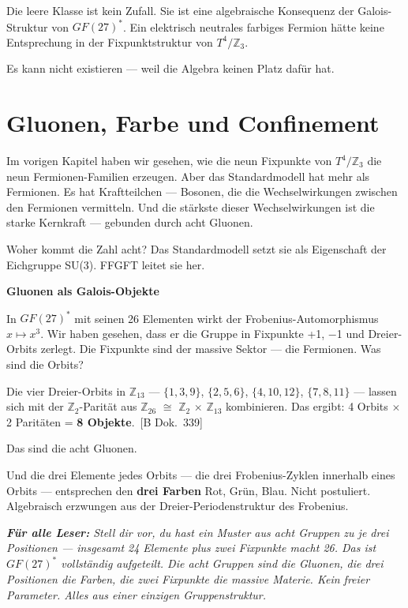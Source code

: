 \documentclass[11pt,oneside]{book}
\newcommand{\status}[1]{\penalty10000\,{\scriptsize\textcolor{gray!60}{[#1]}}}
\newenvironment{laierspur}{%
  \par\vspace{4pt}%
  \noindent\small\itshape\color{blue!60!black}%
  \textbf{Für alle Leser:}\enspace\ignorespaces}{%
  \par\vspace{4pt}\normalsize\normalfont\normalcolor}
\begin{document}
Die leere Klasse ist kein Zufall. Sie ist eine algebraische Konsequenz der
Galois-Struktur von $GF(27)^*$. Ein elektrisch neutrales farbiges Fermion
hätte keine Entsprechung in der Fixpunktstruktur von $T^4/\mathbb{Z}_3$.


Es kann nicht existieren — weil die Algebra keinen Platz dafür hat.








\chapter{Gluonen, Farbe und Confinement}

Im vorigen Kapitel haben wir gesehen, wie die neun Fixpunkte von $T^4/\mathbb{Z}_3$
die neun Fermionen-Familien erzeugen. Aber das Standardmodell hat mehr
als Fermionen. Es hat Kraftteilchen — Bosonen, die die Wechselwirkungen
zwischen den Fermionen vermitteln. Und die stärkste dieser Wechselwirkungen
ist die starke Kernkraft — gebunden durch acht Gluonen.


Woher kommt die Zahl acht? Das Standardmodell setzt sie als Eigenschaft
der Eichgruppe SU(3). FFGFT leitet sie her.


\textbf{Gluonen als Galois-Objekte}


In $GF(27)^*$ mit seinen 26 Elementen wirkt der Frobenius-Automorphismus
$x \mapsto x^3$. Wir haben gesehen, dass er die Gruppe in Fixpunkte {+1, $-$1}
und Dreier-Orbits zerlegt. Die Fixpunkte sind der massive Sektor —
die Fermionen. Was sind die Orbits?


Die vier Dreier-Orbits in $\mathbb{Z}_{13}$ — $\{1,3,9\}$, $\{2,5,6\}$, $\{4,10,12\}$, $\{7,8,11\}$
— lassen sich mit der $\mathbb{Z}_2$-Parität aus $\mathbb{Z}_{26}$ $\cong$ $\mathbb{Z}_2$ $\times$ $\mathbb{Z}_{13}$ kombinieren.
Das ergibt: 4 Orbits $\times$ 2 Paritäten = \textbf{8 Objekte}. \status{B Dok.~339}


Das sind die acht Gluonen.


Und die drei Elemente jedes Orbits — die drei Frobenius-Zyklen innerhalb
eines Orbits — entsprechen den \textbf{drei Farben} Rot, Grün, Blau. Nicht
postuliert. Algebraisch erzwungen aus der Dreier-Periodenstruktur des
Frobenius.


\begin{laierspur}
Stell dir vor, du hast ein Muster aus acht Gruppen zu
je drei Positionen — insgesamt 24 Elemente plus zwei Fixpunkte macht
26. Das ist $GF(27)^*$ vollständig aufgeteilt. Die acht Gruppen sind die
Gluonen, die drei Positionen die Farben, die zwei Fixpunkte die
massive Materie. Kein freier Parameter. Alles aus einer einzigen
Gruppenstruktur.
\end{laierspur}
\end{document}
